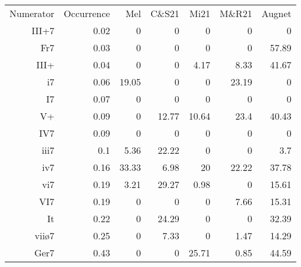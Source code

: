 \begin{tabular}{rrrrrrr}
Numerator & Occurrence & Mel     & C\&S21               & Mi21               & M\&R21                       & Augnet               \\
III+7     & 0.02       & 0       & 0                  & 0                    & 0                           & 0                    \\
Fr7       & 0.03       & 0       & 0                  & 0                    & 0                           & 57.89                \\
III+      & 0.04       & 0       & 0                  & 4.17                 & 8.33                        & 41.67                \\
i7        & 0.06       & 19.05   & 0                  & 0                    & 23.19                       & 0                    \\
I7        & 0.07       & 0       & 0                  & 0                    & 0                           & 0                    \\
V+        & 0.09       & 0       & 12.77              & 10.64                & 23.4                        & 40.43                \\
IV7       & 0.09       & 0       & 0                  & 0                    & 0                           & 0                    \\
iii7      & 0.1        & 5.36    & 22.22              & 0                    & 0                           & 3.7                  \\
iv7       & 0.16       & 33.33   & 6.98               & 20                   & 22.22                       & 37.78                \\
vi7       & 0.19       & 3.21    & 29.27              & 0.98                 & 0                           & 15.61                \\
VI7       & 0.19       & 0       & 0                  & 0                    & 7.66                        & 15.31                \\
It        & 0.22       & 0       & 24.29              & 0                    & 0                           & 32.39                \\
viiø7     & 0.25       & 0       & 7.33               & 0                    & 1.47                        & 14.29                \\
Ger7      & 0.43       & 0       & 0                  & 25.71                & 0.85                        & 44.59                \\

\end{tabular}
